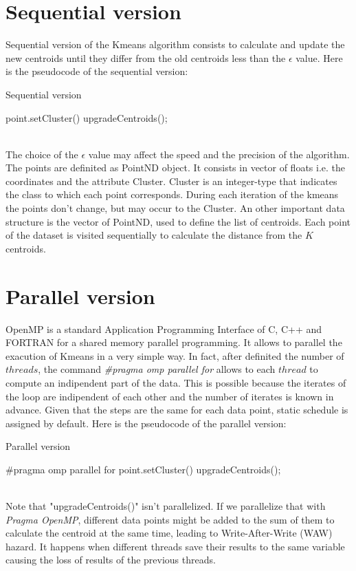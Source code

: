 \documentclass[10pt,twocolumn,letterpaper]{article}
\begin{document}
\section{Sequential version}
Sequential version of the Kmeans algorithm consists to calculate and update the new centroids until they differ from the old centroids less than the $\epsilon$ value. 
Here is the pseudocode of the sequential version:
\begin{algorithm}
\label{sequenziale}
\caption{Sequential version}
\begin{algorithmic}
			\State point.setCluster()
		\EndFor
    		\State upgradeCentroids();
   	 \EndWhile
\end{algorithmic}
\end{algorithm} 
\\
The choice of the $\epsilon$ value may affect the speed and the precision of the algorithm. The points are definited as PointND object. It consists in vector of floats i.e. the coordinates and the attribute Cluster. Cluster is an integer-type that indicates the class to which each point corresponds. During each iteration of the kmeans the points don't change, but may occur to the Cluster. An other important data structure is the vector of PointND, used to define the list of centroids.
Each point of the dataset is visited sequentially to calculate the distance from the $K$ centroids.

\section{Parallel version}
OpenMP  is  a  standard  Application  Programming 
Interface of C, C++ and FORTRAN for a shared memory 
parallel programming. It allows to parallel the exacution of Kmeans in a very simple way.
In fact, after definited the number of $threads$, the command \emph{\#pragma omp parallel for} allows to each $thread$ to compute an 
indipendent part of the data. This is possible because the iterates of the loop are indipendent of each other and the number of iterates is known in advance. 
Given that the steps are the same for each data point, static schedule is assigned by default.
Here is the pseudocode of the parallel version:
\begin{algorithm}
\label{parallelo}
\caption{Parallel version}
\begin{algorithmic}
		\State \#pragma omp parallel for
			\State point.setCluster()
		\EndFor
    		\State upgradeCentroids();
   	 \EndWhile
\end{algorithmic}
\end{algorithm}
\\Note that "upgradeCentroids()" isn't parallelized. If we parallelize that with \emph{Pragma OpenMP}, different data points might be added to the sum of them to calculate the centroid
 at the same time, leading to Write-After-Write (WAW) hazard. It happens when different threads save their results to the same variable causing the loss of results of the previous threads.
\end{document}
